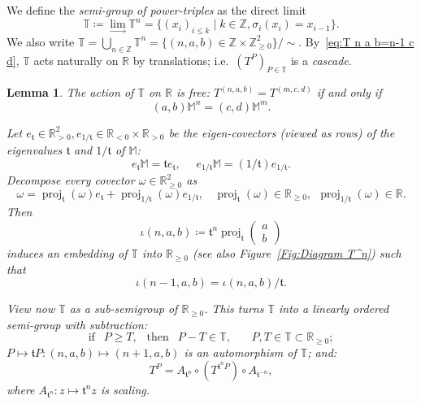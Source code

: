 \documentclass{amsart}
\newcommand{\proj}{\operatorname{proj}}
\renewcommand{\sp}{{\ \ }}
\newcommand{\1}{{\mathbb 1 }}
\newcommand\PT{\mathbb{ T}}
\newcommand\M{\mathbb M}
\renewcommand{\tt}{\mathfrak{t}}
\newcommand{\R}{\mathbb{R}}
\newcommand{\Z}{\mathbb{Z}}
\newtheorem{lem}[thm]{Lemma}
\theoremstyle{remark}
\numberwithin{equation}{section}
\theoremstyle{definition}
\theoremstyle{nonumberbreak}
\begin{document}
We define the \emph{semi-group of power-triples} as the direct limit
\begin{equation}
\label{eq:defn:PT}
\PT\coloneqq \lim_{\longrightarrow }\PT^{n} =\{(x_i)_{i\le k}\mid k\in \Z, \sigma_i(x_i)=x_{i-1}\}.
\end{equation}
We also write $\PT=\displaystyle\bigcup_{n\in \Z} \PT^n=\{(n,a,b)\in \Z\times \Z^2_{\ge 0}\}/\sim$. By~\eqref{eq:T n a b=n-1 c d}, $\PT$ acts naturally on $\R$ by translations; i.e.~$(T^P)_{P\in \PT}$ is a \emph{cascade}. 

\begin{lem} 
\label{lem:PT:rot}
The action of $\PT$ on $\R$ is free: $T^{(n,a,b)}=T^{(m,c,d)}$ if and only if 
\begin{equation}
\label{eq:lem:PT:rot}
(a,b)\M^n = (c,d)\M^{m} .
\end{equation}

 Let $e_{\tt} \in \R^2_{>0},e_{1/\tt} \in \R_{<0}\times  \R_{>0}$ be the eigen-covectors (viewed as rows) of the eigenvalues $\tt$ and $1/\tt$ of $\M$:
\[e_{\tt} \M =\tt e_\tt,\sp\sp\sp  e_{1/\tt} \M =  (1 /\tt )e_{1/\tt}.\]  
   Decompose every covector $\omega \in \R^2_{\ge 0}$ as
\[\omega= \proj_\tt(\omega) e_\tt+\proj_{1/\tt}(\omega) e_{1/\tt},\sp \sp \proj_\tt(\omega)\in \R_{\ge 0},\sp \proj_{1/\tt}(\omega)\in \R.\] Then 
\[\iota(n,a,b)\coloneqq  \tt ^n\proj_\tt  \left(\begin{matrix}
          a \\ b
        \end{matrix}\right)\]
  induces an embedding of $\PT$ into $\R_{\ge 0}$  (see also Figure~\ref{Fig:Diagram T^n}) such that
\[
\iota(n-1,a,b)= \iota(n,a,b)/\tt.
\]

View now $\PT$ as a sub-semigroup of $\R_{\ge0}$. This turns $\PT$ into a linearly ordered semi-group with subtraction:
\[\text {if }\sp P\ge T,\sp\text{ then }\sp  P-T\in \PT,  \sp \sp \sp \sp P,T\in \PT \subset \R_{\ge 0} ;\]
 $P\mapsto \tt P\colon (n,a,b)\mapsto (n+1,a,b)$ is an automorphism of $\PT$; and:
\begin{equation}
\label{eq:T^P vs T^tP}
 T^P=A_{ \tt^{n}} \circ \left(T^{\tt^n P} \right) \circ A_{\tt^{-n}} ,
\end{equation}
where $A_{\tt^n}\colon z\mapsto \tt^n z$ is scaling.
\end{lem}
\end{document}
